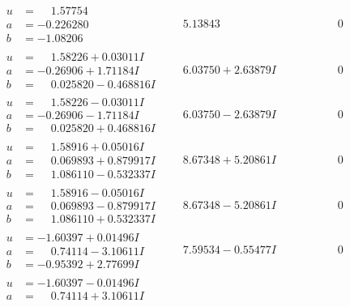 \documentclass[1p]{elsarticle_modified}
\theoremstyle{definition}
\begin{document}
$$\begin{array}{c|c|c}
\begin{aligned}
u &= \phantom{-}1.57754\phantom{ +0.000000I} \\
a &= -0.226280\phantom{ +0.000000I} \\
b &= -1.08206\phantom{ +0.000000I}\end{aligned}
 & \phantom{-}5.13843\phantom{ +0.000000I} & \phantom{-0.000000 } 0 \\ \hline\begin{aligned}
u &= \phantom{-}1.58226 + 0.03011 I \\
a &= -0.26906 + 1.71184 I \\
b &= \phantom{-}0.025820 - 0.468816 I\end{aligned}
 & \phantom{-}6.03750 + 2.63879 I & \phantom{-0.000000 } 0 \\ \hline\begin{aligned}
u &= \phantom{-}1.58226 - 0.03011 I \\
a &= -0.26906 - 1.71184 I \\
b &= \phantom{-}0.025820 + 0.468816 I\end{aligned}
 & \phantom{-}6.03750 - 2.63879 I & \phantom{-0.000000 } 0 \\ \hline\begin{aligned}
u &= \phantom{-}1.58916 + 0.05016 I \\
a &= \phantom{-}0.069893 + 0.879917 I \\
b &= \phantom{-}1.086110 - 0.532337 I\end{aligned}
 & \phantom{-}8.67348 + 5.20861 I & \phantom{-0.000000 } 0 \\ \hline\begin{aligned}
u &= \phantom{-}1.58916 - 0.05016 I \\
a &= \phantom{-}0.069893 - 0.879917 I \\
b &= \phantom{-}1.086110 + 0.532337 I\end{aligned}
 & \phantom{-}8.67348 - 5.20861 I & \phantom{-0.000000 } 0 \\ \hline\begin{aligned}
u &= -1.60397 + 0.01496 I \\
a &= \phantom{-}0.74114 - 3.10611 I \\
b &= -0.95392 + 2.77699 I\end{aligned}
 & \phantom{-}7.59534 - 0.55477 I & \phantom{-0.000000 } 0 \\ \hline\begin{aligned}
u &= -1.60397 - 0.01496 I \\
a &= \phantom{-}0.74114 + 3.10611 I \\

\end{aligned}
\end{array}$$
\end{document}
